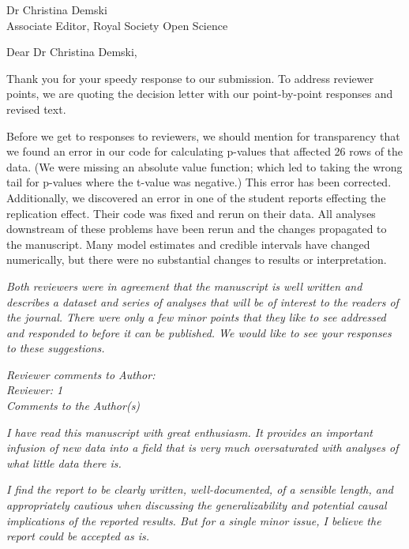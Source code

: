 \documentclass{stanfordletter}
\newcommand{\theysaid}[1]{\begin{leftbar} \noindent 
		\textsl{ #1}\end{leftbar}}
\begin{document}
	\signature{Veronica Boyce \\ Maya Mathur \\ Michael C. Frank}
	
	
	\begin{letter}{Dr Christina Demski \\ Associate Editor, Royal Society Open Science}
		
		
          \opening{Dear Dr Christina Demski,} 
          
          Thank you for your speedy response to our submission. 
          To address reviewer points, we are quoting the decision letter with our point-by-point responses and revised text. 
          
          Before we get to responses to reviewers, we should mention for transparency that we found an error in our code for calculating p-values that affected 26 rows of the data. (We were missing an absolute value function; which led to taking the wrong tail for p-values where the t-value was negative.) This error has been corrected. Additionally, we discovered an error in one of the student reports effecting the replication effect. Their code was fixed and rerun on their data. All analyses downstream of these problems have been rerun and the changes propagated to the manuscript. Many model estimates and credible intervals have changed numerically, but there  were no substantial changes to results or interpretation. 
          
          \theysaid{Both reviewers were in agreement that the manuscript is well written and describes a dataset and series of analyses that will be of interest to the readers of the journal. There were only a few minor points that they like to see addressed and responded to before it can be published. We would like to see your responses to these suggestions.}
          
          \theysaid{Reviewer comments to Author:\\
          Reviewer: 1 \\
          Comments to the Author(s)}
          
          \theysaid{I have read this manuscript with great enthusiasm. It provides an important infusion of new data into a field that is very much oversaturated with analyses of what little data there is.}
        
        \theysaid{I find the report to be clearly written, well-documented, of a sensible length, and appropriately cautious when discussing the generalizability and potential causal implications of the reported results. But for a single minor issue, I believe the report could be accepted as is.}
        

\end{letter}
\end{document}
